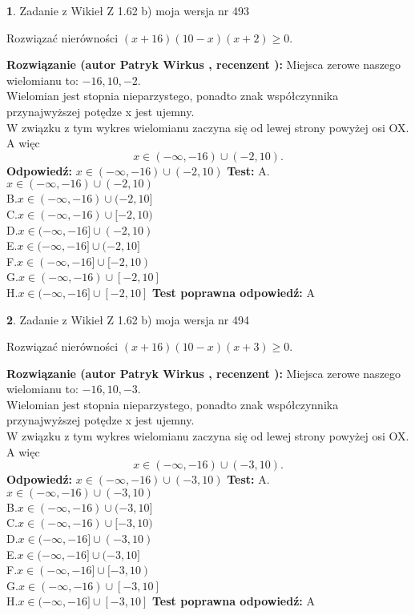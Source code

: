 \documentclass[12pt, a4paper]{article}
\theoremstyle{definition} %
\newtheorem{zad}{}
\newcommand{\zadStart}[1]{\begin{zad}#1\newline}
\newcommand{\zadStop}{\end{zad}}
\newcommand{\rozwStart}[2]{\noindent \textbf{Rozwiązanie (autor #1 , recenzent #2): }\newline}
\newcommand{\rozwStop}{\newline}
\newcommand{\odpStart}{\noindent \textbf{Odpowiedź:}\newline}
\newcommand{\odpStop}{\newline}
\newcommand{\testStart}{\noindent \textbf{Test:}\newline}
\newcommand{\testStop}{\newline}
\newcommand{\kluczStart}{\noindent \textbf{Test poprawna odpowiedź:}\newline}
\newcommand{\kluczStop}{\newline}
\begin{document}
\zadStart{Zadanie z Wikieł Z 1.62 b) moja wersja nr 493}

Rozwiązać nierówności $(x+16)(10-x)(x+2)\ge0$.
\zadStop
\rozwStart{Patryk Wirkus}{}
Miejsca zerowe naszego wielomianu to: $-16, 10, -2$.\\
Wielomian jest stopnia nieparzystego, ponadto znak współczynnika przy\linebreak najwyższej potędze x jest ujemny.\\ W związku z tym wykres wielomianu zaczyna się od lewej strony powyżej osi OX. A więc $$x \in (-\infty,-16) \cup (-2,10).$$
\rozwStop
\odpStart
$x \in (-\infty,-16) \cup (-2,10)$
\odpStop
\testStart
A.$x \in (-\infty,-16) \cup (-2,10)$\\
B.$x \in (-\infty,-16) \cup (-2,10]$\\
C.$x \in (-\infty,-16) \cup [-2,10)$\\
D.$x \in (-\infty,-16] \cup (-2,10)$\\
E.$x \in (-\infty,-16] \cup (-2,10]$\\
F.$x \in (-\infty,-16] \cup [-2,10)$\\
G.$x \in (-\infty,-16) \cup [-2,10]$\\
H.$x \in (-\infty,-16] \cup [-2,10]$
\testStop
\kluczStart
A
\kluczStop



\zadStart{Zadanie z Wikieł Z 1.62 b) moja wersja nr 494}

Rozwiązać nierówności $(x+16)(10-x)(x+3)\ge0$.
\zadStop
\rozwStart{Patryk Wirkus}{}
Miejsca zerowe naszego wielomianu to: $-16, 10, -3$.\\
Wielomian jest stopnia nieparzystego, ponadto znak współczynnika przy\linebreak najwyższej potędze x jest ujemny.\\ W związku z tym wykres wielomianu zaczyna się od lewej strony powyżej osi OX. A więc $$x \in (-\infty,-16) \cup (-3,10).$$
\rozwStop
\odpStart
$x \in (-\infty,-16) \cup (-3,10)$
\odpStop
\testStart
A.$x \in (-\infty,-16) \cup (-3,10)$\\
B.$x \in (-\infty,-16) \cup (-3,10]$\\
C.$x \in (-\infty,-16) \cup [-3,10)$\\
D.$x \in (-\infty,-16] \cup (-3,10)$\\
E.$x \in (-\infty,-16] \cup (-3,10]$\\
F.$x \in (-\infty,-16] \cup [-3,10)$\\
G.$x \in (-\infty,-16) \cup [-3,10]$\\
H.$x \in (-\infty,-16] \cup [-3,10]$
\testStop
\kluczStart
A
\kluczStop
\end{document}
